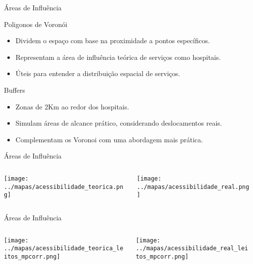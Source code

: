 \documentclass{beamer}
\begin{document}
\begin{frame}{Áreas de Influência}
    \begin{block}{Poligonos de Voronói}
      \begin{itemize}
        \item Dividem o espaço com base na proximidade a pontos específicos.
        \item Representam a área de influência teórica de serviços como hospitais.
        \item Úteis para entender a distribuição espacial de serviços.
      \end{itemize}
    \end{block}

    \begin{block}{Buffers}
      \begin{itemize}
        \item Zonas de 2Km ao redor dos hospitais.
        \item Simulam áreas de alcance prático, considerando deslocamentos reais.
        \item Complementam os Voronoi com uma abordagem mais prática.
      \end{itemize}    \end{block}
\end{frame}

\begin{frame}{Áreas de Influência}
    \begin{columns}
        \begin{column}{0.5\textwidth}
            \centering
            \texttt{[image: ../mapas/acessibilidade\_teorica.png]} 
        \end{column}

        \begin{column}{0.5\textwidth}
            \centering
            \texttt{[image: ../mapas/acessibilidade\_real.png]} 
        \end{column}
    \end{columns}
\end{frame}

\begin{frame}{Áreas de Influência}
    \begin{columns}
        \begin{column}{0.5\textwidth}
            \texttt{[image: ../mapas/acessibilidade\_teorica\_leitos\_mpcorr.png]} 
        \end{column}

        \begin{column}{0.5\textwidth}
            \texttt{[image: ../mapas/acessibilidade\_real\_leitos\_mpcorr.png]} 
        \end{column}
    \end{columns}
\end{frame}
\end{document}
